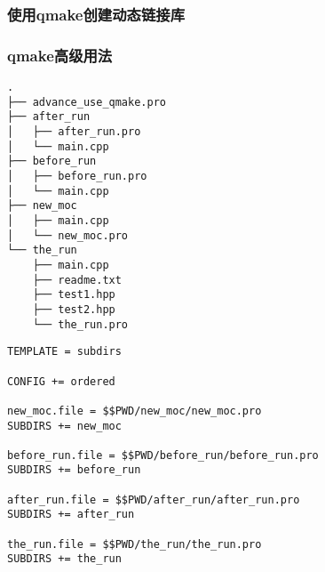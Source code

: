 \subsubsection{
使用qmake创建动态链接库
}\label{ss000710}



\subsubsection{
qmake高级用法
}\label{ss000810}


\begin{lstlisting}[label=d000000, 
numbers=none,
title=\theTreeIndexNumber
]
.
├── advance_use_qmake.pro
├── after_run
│   ├── after_run.pro
│   └── main.cpp
├── before_run
│   ├── before_run.pro
│   └── main.cpp
├── new_moc
│   ├── main.cpp
│   └── new_moc.pro
└── the_run
    ├── main.cpp
    ├── readme.txt
    ├── test1.hpp
    ├── test2.hpp
    └── the_run.pro
\end{lstlisting}          %


\begin{lstlisting}[label=f000004, 
caption=GoodLuck,
title=\lstlistingname\ \thelstlisting
]
TEMPLATE = subdirs

CONFIG += ordered

new_moc.file = $$PWD/new_moc/new_moc.pro
SUBDIRS += new_moc

before_run.file = $$PWD/before_run/before_run.pro
SUBDIRS += before_run

after_run.file = $$PWD/after_run/after_run.pro
SUBDIRS += after_run

the_run.file = $$PWD/the_run/the_run.pro
SUBDIRS += the_run
\end{lstlisting}          %

